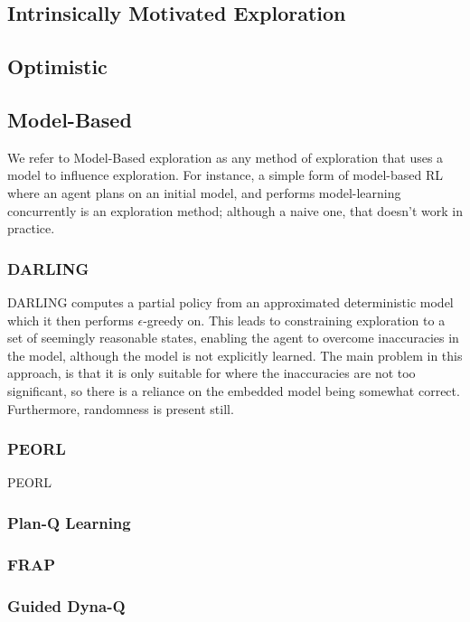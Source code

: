 \subsection{Intrinsically Motivated Exploration}
\citep{scott1996, pmlr-v97-jinnai19b, Jinnai2020Exploration}
\subsection{Optimistic}
\citep{10.1145/1390156.1390288, NIPS2006_c1b70d96, 10.1162/153244303765208377, NIPS2008_d5cfead9}
\subsection{Model-Based}
We refer to Model-Based exploration as any method of exploration that uses a model to influence exploration. For instance, a simple form of model-based RL where an agent plans on an initial model, and performs model-learning concurrently is an exploration method; although a naive one, that doesn't work in practice.\\
\citep{SARA07-jong, Littman2011EfficientME, Epshteyn2008ActiveRL}
\subsubsection{DARLING}
DARLING \citep{AIJ16-leonetti} computes a partial policy from an approximated deterministic model which it then performs $\epsilon$-greedy on. This leads to constraining exploration to a set of seemingly reasonable states, enabling the agent to overcome inaccuracies in the model, although the model is not explicitly learned. The main problem in this approach, is that it is only suitable for where the inaccuracies are not too significant, so there is a reliance on the embedded model being somewhat correct. Furthermore, randomness is present still.
\subsubsection{PEORL}
PEORL \citep{DBLP:journals/corr/abs-1804-07779}
\subsubsection{Plan-Q Learning}
\citep{10.1007/978-3-540-77949-0_6}
\subsubsection{FRAP}
\citep{DBLP:journals/corr/abs-2006-15009}
\subsubsection{Guided Dyna-Q}
\citep{Hayamizu2021GuidingRE}
